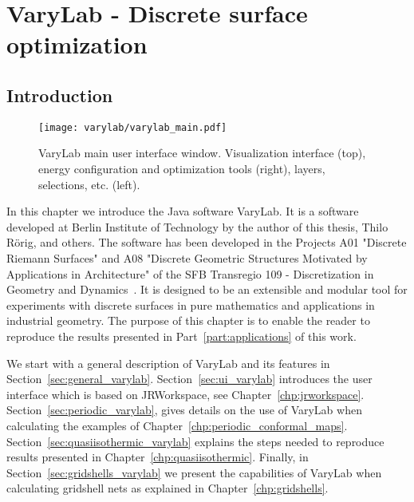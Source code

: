 \documentclass[Thesis.tex]{subfiles}
\begin{document}
\chapter{{\sc VaryLab} - Discrete surface optimization}
\label{chp:varylab}

\section{Introduction}

\begin{figure}
    \begin{center}
    \texttt{[image: varylab/varylab\_main.pdf]}
    \caption{{\sc VaryLab} main user interface window. Visualization interface (top), energy configuration and optimization tools (right), layers, selections, etc. (left).}
    \label{fig:varylab_main_ui}
    \end{center}
\end{figure}

In this chapter we introduce the {\sc Java} software {\sc VaryLab}. 
It is a software developed at Berlin Institute of Technology by the author of this thesis, Thilo R\"orig, and others. 
The software has been developed in the Projects A01 "Discrete Riemann Surfaces" and A08 "Discrete Geometric Structures Motivated by Applications in Architecture" of the SFB Transregio 109 - Discretization in Geometry and Dynamics~\cite{sfb-webpage}.
It is designed to be an extensible and modular tool for experiments with discrete surfaces in pure mathematics and applications in industrial geometry. 
The purpose of this chapter is to enable the reader to reproduce the results presented in Part~\ref{part:applications} of this work.

We start with a general description of {\sc VaryLab} and its features in Section~\ref{sec:general_varylab}. Section~\ref{sec:ui_varylab} introduces the user interface which is based on {\sc JRWorkspace}, see Chapter~\ref{chp:jrworkspace}. Section~\ref{sec:periodic_varylab}, gives details on the use of {\sc VaryLab} when calculating the examples of Chapter~\ref{chp:periodic_conformal_maps}. Section~\ref{sec:quasiisothermic_varylab} explains the steps needed to reproduce results presented in Chapter~\ref{chp:quasiisothermic}. Finally, in Section~\ref{sec:gridshells_varylab} we present the capabilities of {\sc VaryLab} when calculating gridshell nets as explained in Chapter~\ref{chp:gridshells}.

\end{document}
